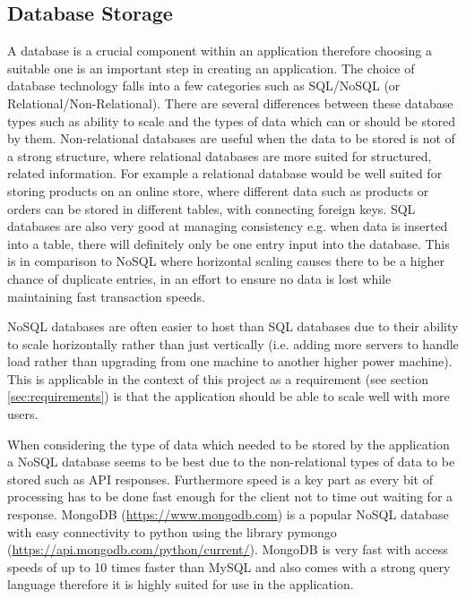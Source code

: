 \documentclass[a4paper,12pt]{report}
\begin{document}
      \subsection{Database Storage} %
        A database is a crucial component within an application therefore choosing a suitable one is an important step in creating an application. The choice of database technology falls into a few categories such as SQL/NoSQL (or Relational/Non-Relational). There are several differences between these database types such as ability to scale and the types of data which can or should be stored by them. Non-relational databases are useful when the data to be stored is not of a strong structure, where relational databases are more suited for structured, related information. For example a relational database would be well suited for storing products on an online store, where different data such as products or orders can be stored in different tables, with connecting foreign keys. SQL databases are also very good at managing consistency e.g. when data is inserted into a table, there will definitely only be one entry input into the database. This is in comparison to NoSQL where horizontal scaling causes there to be a higher chance of duplicate entries, in an effort to ensure no data is lost while maintaining fast transaction speeds.

        NoSQL databases are often easier to host than SQL databases due to their ability to scale horizontally \citep{cattell2011scalable} rather than just vertically (i.e. adding more servers to handle load rather than upgrading from one machine to another higher power machine). This is applicable in the context of this project as a requirement (see section \ref{sec:requirements}) is that the application should be able to scale well with more users.

        When considering the type of data which needed to be stored by the application a NoSQL database seems to be best due to the non-relational types of data to be stored such as API responses. Furthermore speed is a key part as every bit of processing has to be done fast enough for the client not to time out waiting for a response. MongoDB (\url{https://www.mongodb.com}) is a popular NoSQL database with easy connectivity to python using the library pymongo (\url{https://api.mongodb.com/python/current/}). MongoDB is very fast with access speeds of up to 10 times faster than MySQL \citep{han2011survey} and also comes with a strong query language therefore it is highly suited for use in the application.
\end{document}
